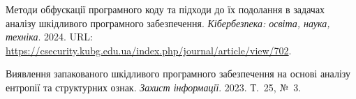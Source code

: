  Методи обфускації програмного коду та підходи до їх подолання в задачах аналізу шкідливого програмного забезпечення. \emph{Кібербезпека: освіта, наука, техніка}. 2024. URL: \url{https://csecurity.kubg.edu.ua/index.php/journal/article/view/702}.

 Виявлення запакованого шкідливого програмного забезпечення на основі аналізу ентропії та структурних ознак. \emph{Захист інформації}. 2023. Т.~25, №~3.
